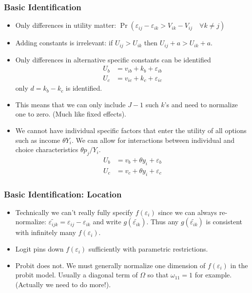 \begin{frame}
\frametitle{Basic Identification}
\small
\begin{itemize}
\item Only differences in utility matter: $\Pr( \varepsilon_{ij}-\varepsilon_{ik} > V_{ik} - V_{ij} \quad \forall k \neq j)$
\item Adding constants is irrelevant: if $U_{ij} > U_{ik}$ then $U_{ij} + a > U_{ik} + a$.
\item Only differences in alternative specific constants can be identified
\begin{align*}
U_b &= v_{ib} + k_b  + \varepsilon_{ib}\\
U_c &= v_{ic} + k_c  + \varepsilon_{ic}
\end{align*}
only $d = k_b - k_c$ is identified.
\item This means that we can only include $J-1$ such $k$'s and need to normalize one to zero. (Much like fixed effects).
\item We cannot have individual specific factors that enter the utility of all options such as income $\theta Y_i$. We can allow for interactions between individual and choice characteristics $\theta p_{j}/ Y_i$.
\begin{align*}
U_b &= v_{b} + \theta y_i  + \varepsilon_b\\
U_c &= v_{c} + \theta y_i  + \varepsilon_c
\end{align*}

\end{itemize}
\end{frame}

\begin{frame}
\frametitle{Basic Identification: Location}
\begin{itemize}
\item Technically we can't really fully specify $f(\varepsilon_i)$ since we can always re-normalize: $\widetilde{\varepsilon_{ijk}} = \varepsilon_{ij} - \varepsilon_{ik}$ and write $g(\widetilde{\varepsilon_{ik}})$. Thus any $g(\widetilde{\varepsilon_{ik}})$ is consistent with infinitely many $f(\varepsilon_i)$.
\item Logit pins down $f(\varepsilon_i)$ sufficiently with parametric restrictions.
\item Probit does not. We must generally normalize one dimension of $f(\varepsilon_i)$ in the probit model. Usually a diagonal term of $\Omega$ so that $\omega_{11} =1$ for example. (Actually we need to do more!).
\end{itemize}
\end{frame}



